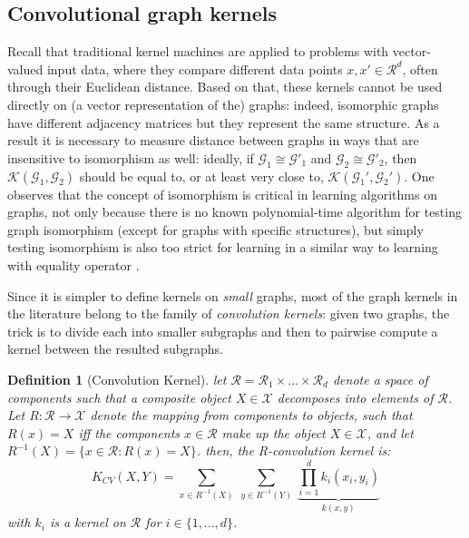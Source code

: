 \subsection{Convolutional graph kernels}
Recall that traditional kernel machines are applied to problems with vector-valued input data, where they compare different data points $x,x' \in \mathcal{R}^d$,  often through their Euclidean distance. Based on that, these kernels cannot be used directly on (a vector representation of the) graphs: indeed, isomorphic graphs have different adjacency matrices but they represent the same structure. As a result it is necessary to measure distance between graphs in ways that are insensitive to isomorphism as well: ideally, if $\mathcal{G}_1 \cong \mathcal{G}'_1$ and $\mathcal{G}_2 \cong \mathcal{G}'_2$, then $\mathcal{K}(\mathcal{G}_1, \mathcal{G}_2)$ should be equal to, or at least very close to, $\mathcal{K}(\mathcal{G}_1', \mathcal{G}_2')$. One observes that the concept of isomorphism is critical in learning algorithms on graphs, not only because there is no known polynomial-time algorithm for testing graph isomorphism (except for graphs with specific structures), but simply testing isomorphism is also too strict for learning in a similar way to learning with equality operator \citep{kriege_graph_kernels}.

Since it is simpler to define kernels on \emph{small} graphs, most of the graph kernels in the literature belong to the family of \emph{convolution kernels}: given two graphs, the trick is to divide each into smaller subgraphs and then to pairwise compute a kernel between the resulted subgraphs.
\newtheorem{definition}{Definition} 
\begin{definition}[Convolution Kernel]
let $\mathcal{R}=\mathcal{R}_1\times...\times \mathcal{R}_d$ denote a space of components such that a composite object $X\in \mathcal{X}$ decomposes into elements of $\mathcal{R}$. Let $R:\mathcal{R}\xrightarrow{}\mathcal{X}$ denote the mapping from components to objects, such that $R(x)=X$ iff the components $x\in \mathcal{R}$ make up the object $X\in \mathcal{X}$, and let $R^{-1}(X)=\{x\in\mathcal{R}:R(x)=X\}$. then, the R-convolution kernel is:
\begin{equation}
\label{eq:conolutional_kernels}
    K_{CV}(X,Y)=\sum_{x\in R^{-1}(X)}~\sum_{y\in R^{-1}(Y)}~\underbrace{\prod_{i=1}^{d}k_i(x_i,y_i)}_{k(x,y)}
\end{equation}
with $k_i$ is a kernel on $\mathcal{R}$ for $i\in\{1,...,d\}$.
\end{definition}

